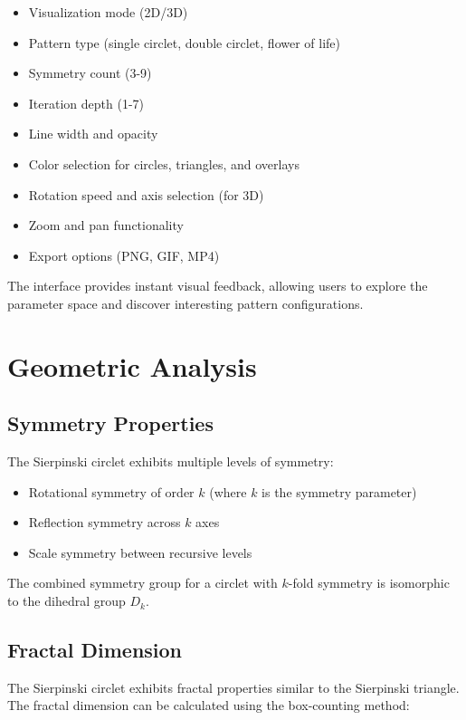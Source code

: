 \documentclass[12pt,a4paper]{article}
\begin{document}
\begin{itemize}
    \item Visualization mode (2D/3D)
    \item Pattern type (single circlet, double circlet, flower of life)
    \item Symmetry count (3-9)
    \item Iteration depth (1-7)
    \item Line width and opacity
    \item Color selection for circles, triangles, and overlays
    \item Rotation speed and axis selection (for 3D)
    \item Zoom and pan functionality
    \item Export options (PNG, GIF, MP4)
\end{itemize}

The interface provides instant visual feedback, allowing users to explore the parameter space and discover interesting pattern configurations.

\section{Geometric Analysis}

\subsection{Symmetry Properties}
The Sierpinski circlet exhibits multiple levels of symmetry:

\begin{itemize}
    \item Rotational symmetry of order $k$ (where $k$ is the symmetry parameter)
    \item Reflection symmetry across $k$ axes
    \item Scale symmetry between recursive levels
\end{itemize}

The combined symmetry group for a circlet with $k$-fold symmetry is isomorphic to the dihedral group $D_k$.

\subsection{Fractal Dimension}
The Sierpinski circlet exhibits fractal properties similar to the Sierpinski triangle. The fractal dimension can be calculated using the box-counting method:
\end{document}

